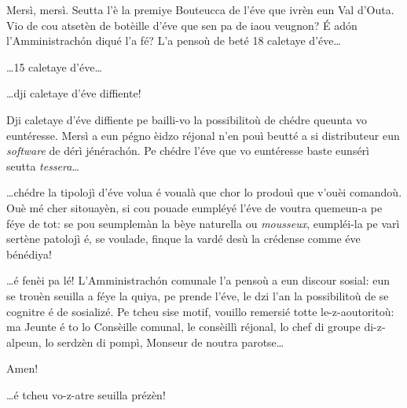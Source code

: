 \begin{drama}

\Seunteuccospeaks Mersì, mersì. Seutta l'è la premiye Bouteucca de l'é\-ve que ivrèn eun Val d'Outa. Vio de cou atsetèn de botèille d'éve que sen pa de iaou veugnon? \'E ad\'on l’Amministrach\'on diqué l’a fé? L'a pensoù de beté 18 caletaye d’éve\ldots


\Seunteuccospeaks \ldots 15 caletaye d’éve\ldots


\Seunteuccospeaks \ldots dji caletaye d’éve
 diffiente!
 
 
\Seunteuccospeaks  Dji caletaye d’éve
 diffiente pe bailli-vo la possibilitoù de chédre queunta vo euntéresse. Mersì a eun pégno èidzo réjonal n'en pouì beutté a si distributeur eun \textit{software} de dérì jénérach\'on. Pe chédre l'éve que vo euntéresse baste eunsérì  seutta \textit{tessera}\ldots
 
 
\Seunteuccospeaks \ldots  chédre la tipolojì d’éve volua é voualà que chor lo prodouì que v'ouèi comandoù. Ouè mé cher sitouayèn, si cou pouade eumpléyé l'éve de voutra quemeun-a pe féye de tot: se pou seumplemàn la bèye naturella ou \textit{mousseux}, eumpléi-la pe varì sertène patolojì é, se voulade, finque la vardé desù la crédense comme éve bénédiya!


\Seunteuccospeaks \ldots é fenèi pa lé! L’Amministrach\'on comunale l’a pensoù a eun discour sosial: eun se trouèn seuilla a féye la quiya, pe prende l’éve, le dzi l’an la possibilitoù de se cognitre é de sosializé. Pe tcheu sise motif, vouillo remersié totte le-z-aoutoritoù: ma Jeunte é to lo Consèille comunal, le consèillì réjonal, lo chef di groupe di-z-alpeun, lo serdzèn di pompì, Monseur de noutra parotse\ldots

\Donspeaks {} Amen! \stufo


\Seunteuccospeaks \ldots é tcheu vo-z-atre seuilla prézèn!


\end{drama}
